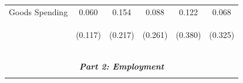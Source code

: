 \documentclass[dv_diss_main.tex]{subfiles}
\begin{document}
\begin{table}[H]
\begin{center}
{\begin{tabular}{lccccc}
    Goods Spending & 0.060 & 0.154 & 0.088 & 0.122 & 0.068 \\
     & \begin{footnotesize}(0.117)\end{footnotesize} & \begin{footnotesize}(0.217)\end{footnotesize} & \begin{footnotesize}(0.261)\end{footnotesize} & \begin{footnotesize}(0.380)\end{footnotesize} & \begin{footnotesize}(0.325)\end{footnotesize} \\

     
    \vspace{-2pt} & \vspace{-2pt} & \vspace{-2pt} & \vspace{-2pt} & \vspace{-2pt} \\\hline
    \vspace{-1.5pt} & \vspace{-1.5pt} & \vspace{-1.5pt} & \vspace{-1.5pt} & \vspace{-1.5pt} \\
    \cmidrule{1-6}
    \vspace{-1.5pt} & \vspace{-1.5pt} & \vspace{-1.5pt} & \vspace{-1.5pt} & \vspace{-1.5pt} \\
    \multicolumn{6}{c}{\textit{\textbf{Part 2: Employment}}} \\ 
    \vspace{-1.5pt} & \vspace{-1.5pt} & \vspace{-1.5pt} & \vspace{-1.5pt} & \vspace{-1.5pt} \\ 


\end{tabular}}
\end{center}
\end{table}
\end{document}
